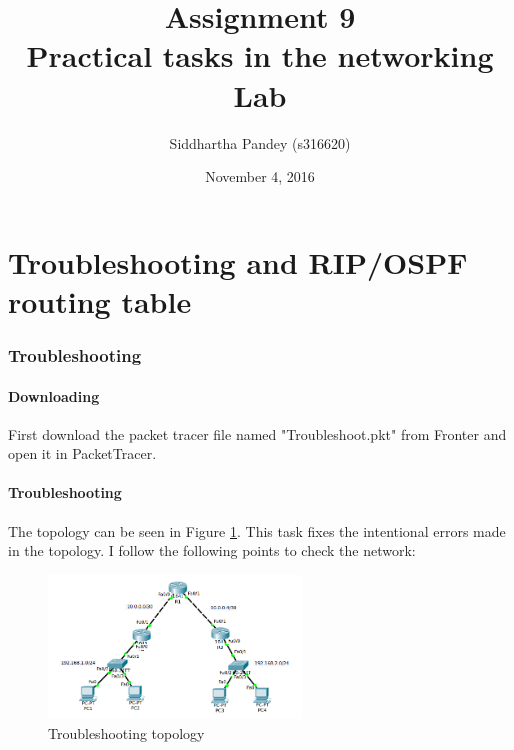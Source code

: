 \documentclass{article}
\date{November 4, 2016}
\title{\textbf{Assignment 9}\\Practical tasks in the networking Lab}
\author{Siddhartha Pandey (s316620)\\
}
\begin{document}
\maketitle
\newpage
\tableofcontents
\newpage



\part{Troubleshooting and RIP/OSPF routing table}

\section{Troubleshooting}

\subsection{Downloading} First download the packet tracer file named "Troubleshoot.pkt" from Fronter and open it in PacketTracer. 

\subsection{Troubleshooting}

The topology can be seen in Figure \ref{fig:1topo}. This task fixes the intentional errors made in the topology. I follow the following points to check the network:

\begin{figure}[h]
    \centering
    \includegraphics[width=0.6\textwidth]{1topo}
    \caption{Troubleshooting topology }
    \label{fig:1topo}
\end{figure}
\end{document}
